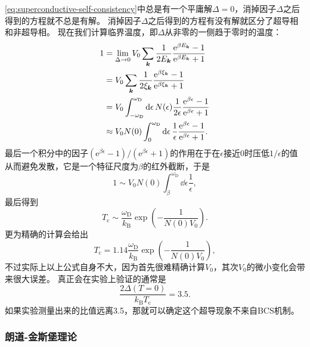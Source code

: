 \documentclass[hyperref, UTF8, a4paper]{ctexart}
\newcommand*{\ee}{\mathrm{e}}
\begin{document}
\eqref{eq:superconductive-self-consistency}中总是有一个平庸解$\Delta = 0$，消掉因子$\Delta$之后得到的方程就不总是有解。
消掉因子$\Delta$之后得到的方程有没有解就区分了超导相和非超导相。
现在我们计算临界温度，即$\Delta$从非零的一侧趋于零时的温度：
\[
    \begin{aligned}
        1 &= \lim_{\Delta \to 0} V_0 \sum_{\vb*{k}} \frac{1}{2 E_{\vb*{k}}} \frac{\ee^{\beta E_{\vb*{k}}} - 1}{\ee^{\beta E_{\vb*{k}}} + 1} \\
        &= V_0 \sum_{\vb*{k}} \frac{1}{2 \xi_{\vb*{k}}} \frac{\ee^{\beta \xi_{\vb*{k}}} - 1}{\ee^{\beta \xi_{\vb*{k}}} + 1} \\
        &= V_0 \int_{-\omega_\text{D}}^{\omega_\text{D}} \dd{\epsilon} N(\epsilon) \frac{1}{2 \epsilon} \frac{\ee^{\beta \epsilon} - 1}{\ee^{\beta \epsilon} + 1} \\
        &\approx V_0 N(0) \int_{0}^{\omega_\text{D}} \dd{\epsilon} \frac{1}{\epsilon} \frac{\ee^{\beta \epsilon} - 1}{\ee^{\beta \epsilon} + 1}.
    \end{aligned}
\]
最后一个积分中的因子$(\ee^{\beta \epsilon} - 1) / (\ee^{\beta \epsilon} + 1)$的作用在于在$\epsilon$接近$0$时压低$1/\epsilon$的值从而避免发散，它是一个特征尺度为$\beta$的红外截断，于是
\[
    1 \sim V_0 N(0) \int_{\beta}^{\omega_\text{D}} \dd{\epsilon} \frac{1}{\epsilon},
\]
最后得到
\begin{equation}
    T_\text{c} \sim \frac{\omega_\text{D}}{k_\text{B}} \exp \left( - \frac{1}{N(0) V_0} \right).
\end{equation}
更为精确的计算会给出
\begin{equation}
    T_\text{c} = 1.14 \frac{\omega_\text{D}}{k_\text{B}} \exp \left( - \frac{1}{N(0) V_0} \right),
\end{equation}
不过实际上以上公式自身不大，因为首先很难精确计算$V_0$，其次$V_0$的微小变化会带来很大误差。
真正会在实验上验证的通常是
\begin{equation}
    \frac{2 \Delta(T=0)}{k_\text{B} T_\text{c}} = 3.5.
\end{equation}
如果实验测量出来的比值远离3.5，那就可以确定这个超导现象不来自BCS机制。

\subsubsection{朗道-金斯堡理论}
\end{document}
